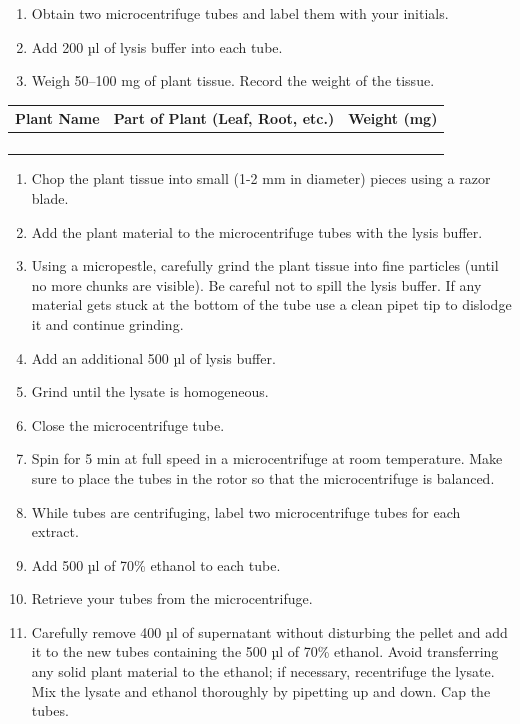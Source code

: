 \documentclass[]{book}
\providecommand{\tightlist}{%
  \setlength{\itemsep}{0pt}\setlength{\parskip}{0pt}}
\theoremstyle{definition}
\theoremstyle{definition}
\theoremstyle{definition}
\theoremstyle{remark}
\begin{document}
\begin{enumerate}
\def\labelenumi{\arabic{enumi}.}
\tightlist
\item
  Obtain two microcentrifuge tubes and label them with your initials.
\item
  Add 200 µl of lysis buffer into each tube.
\item
  Weigh 50--100 mg of plant tissue. Record the weight of the tissue.
\end{enumerate}

\begin{longtable}[]{@{}lll@{}}
\toprule
Plant Name & Part of Plant (Leaf, Root, etc.) & Weight
(mg)\tabularnewline
\midrule
\endhead
& &\tabularnewline
& &\tabularnewline
& &\tabularnewline
& &\tabularnewline
\bottomrule
\end{longtable}

\begin{enumerate}
\def\labelenumi{\arabic{enumi}.}
\setcounter{enumi}{3}
\tightlist
\item
  Chop the plant tissue into small (1-2 mm in diameter) pieces using a
  razor blade.
\item
  Add the plant material to the microcentrifuge tubes with the lysis
  buffer.
\item
  Using a micropestle, carefully grind the plant tissue into fine
  particles (until no more chunks are visible). Be careful not to spill
  the lysis buffer. If any material gets stuck at the bottom of the tube
  use a clean pipet tip to dislodge it and continue grinding.
\item
  Add an additional 500 µl of lysis buffer.
\item
  Grind until the lysate is homogeneous.
\item
  Close the microcentrifuge tube.
\item
  Spin for 5 min at full speed in a microcentrifuge at room temperature.
  Make sure to place the tubes in the rotor so that the microcentrifuge
  is balanced.\\
\item
  While tubes are centrifuging, label two microcentrifuge tubes for each
  extract.
\item
  Add 500 µl of 70\% ethanol to each tube.
\item
  Retrieve your tubes from the microcentrifuge.
\item
  Carefully remove 400 µl of supernatant without disturbing the pellet
  and add it to the new tubes containing the 500 µl of 70\% ethanol.
  Avoid transferring any solid plant material to the ethanol; if
  necessary, recentrifuge the lysate. Mix the lysate and ethanol
  thoroughly by pipetting up and down. Cap the tubes.
\end{enumerate}
\end{document}

